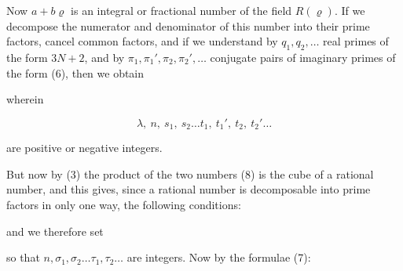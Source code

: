 
Now $a + b\varrho$ is an integral or fractional number of the field $R(\varrho)$.
If we decompose the numerator and denominator of this number into their prime
factors, cancel common factors, and if we understand by $q_1, q_2, \ldots$ real
primes of the form $3N+2$, and by $\pi_1, \pi_1', \pi_2, \pi_2', \ldots$
conjugate pairs of imaginary primes of the form (6), then we obtain


wherein

\[
\lambda, \ n, \ s_1, \ s_2 \ldots t_1, \ t_1', \ t_2, \ t_2' \ldots
\]

are positive or negative integers.

But now by (3) the product of the two numbers (8) is the cube of a rational
number, and this gives, since a rational number is decomposable into prime
factors in only one way, the following conditions:


and we therefore set


so that $n, \sigma_1, \sigma_2 \ldots \tau_1, \tau_2 \ldots$ are integers. %
Now by the formulae (7):


